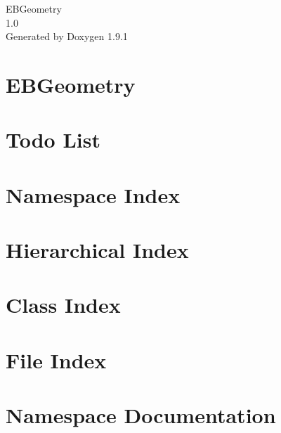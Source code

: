 \let\mypdfximage\pdfximage\def\pdfximage{\immediate\mypdfximage}\documentclass[twoside]{book}
\newcommand{\+}{\discretionary{\mbox{\scriptsize$\hookleftarrow$}}{}{}}
\newcommand{\clearemptydoublepage}{%
  \newpage{\pagestyle{empty}\cleardoublepage}%
}
\begin{document}
\raggedbottom

\hypersetup{pageanchor=false,
             bookmarksnumbered=true,
             pdfencoding=unicode
            }
\begin{titlepage}
\vspace*{7cm}
\begin{center}%
{\Large EBGeometry \\[1ex]\large 1.\+0 }\\
\vspace*{1cm}
{\large Generated by Doxygen 1.9.1}\\
\end{center}
\end{titlepage}
\clearemptydoublepage
{}
\tableofcontents
\clearemptydoublepage
{}
\hypersetup{pageanchor=true}

\chapter{EBGeometry}
\label{index}\hypertarget{index}{}
\chapter{Todo List}
\label{todo}

\chapter{Namespace Index}

\chapter{Hierarchical Index}

\chapter{Class Index}

\chapter{File Index}

\chapter{Namespace Documentation}





\end{document}

